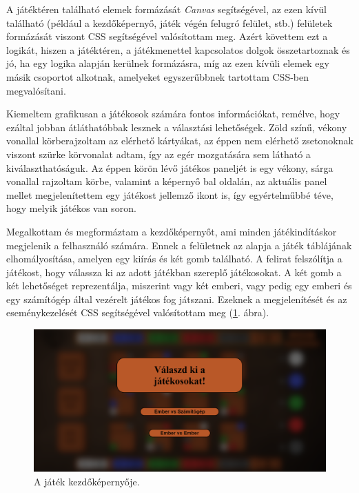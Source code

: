
A játéktéren található elemek formázását \textit{Canvas} segítségével, az ezen kívül található (például a kezdőképernyő, játék végén felugró felület, stb.) felületek formázását viszont CSS segítségével valósítottam meg. Azért követtem ezt a logikát, hiszen a játéktéren, a játékmenettel kapcsolatos dolgok összetartoznak és jó, ha egy logika alapján kerülnek formázásra, míg az ezen kívüli elemek egy másik csoportot alkotnak, amelyeket egyszerűbbnek tartottam CSS-ben megvalósítani.


Kiemeltem grafikusan a játékosok számára fontos információkat, remélve, hogy ezáltal jobban átláthatóbbak lesznek a választási lehetőségek. Zöld színű, vékony vonallal körberajzoltam az elérhető kártyákat, az éppen nem elérhető zsetonoknak viszont szürke körvonalat adtam, így az egér mozgatására sem látható a kiválaszthatóságuk. Az éppen körön lévő játékos paneljét is egy vékony, sárga vonallal rajzoltam körbe, valamint a képernyő bal oldalán, az aktuális panel mellet megjelenítettem egy játékost jellemző ikont is, így egyértelműbbé téve, hogy melyik játékos van soron.


Megalkottam és megformáztam a kezdőképernyőt, ami minden játékindításkor megjelenik a felhasználó számára. Ennek a felületnek az alapja a játék táblájának elhomályosítása, amelyen egy kiírás és két gomb található. A felirat felszólítja a játékost, hogy válassza ki az adott játékban szereplő játékosokat. A két gomb a két lehetőséget reprezentálja, miszerint vagy két emberi, vagy pedig egy emberi és egy számítógép által vezérelt játékos fog játszani. Ezeknek a megjelenítését és az eseménykezelését CSS segítségével valósítottam meg (\ref{fig:start_screen}. ábra).

\begin{figure}[h]
\centering
\includegraphics[width=\textwidth]{images/start_screen.png}
\caption{A játék kezdőképernyője.}
\label{fig:start_screen}
\end{figure}


